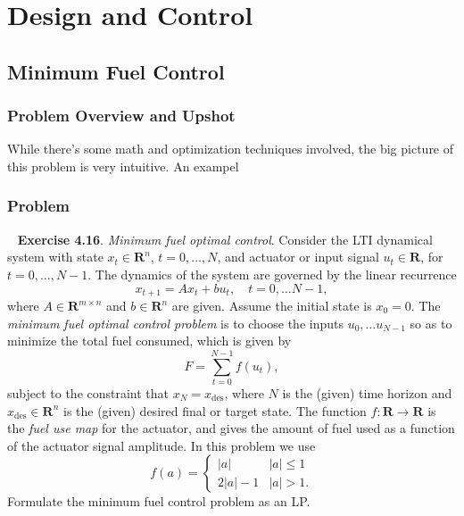 \documentclass[12pt,reqno]{article}
\theoremstyle{definition}
\numberwithin{equation}{section}
\begin{document}
\newpage

\section{Design and Control}

\subsection{Minimum Fuel Control}

\subsubsection*{Problem Overview and Upshot}
While there's some math and optimization techniques involved, the big picture of this problem is very intuitive.
An exampel 
\subsubsection*{Problem}

\noindent~\cite{boyd_convex_optimization} \textbf{Exercise 4.16}. \textit{Minimum fuel optimal control}.
    Consider the LTI dynamical system with state $x_t \in \mathbf{R}^n$, $t = 0, \ldots, N$, and actuator
    or input signal $u_t \in \mathbf{R}$, for $t = 0, \ldots, N-1$. The dynamics of the system are governed by the
    linear recurrence
    \[x_{t+1} = Ax_t + bu_t, \quad t=0, \ldots N-1,\]
    where $A \in \mathbf{R}^{m \times n}$ and $b \in \mathbf{R}^n$ are given. Assume the initial state is $x_0 = 0$.
    The \textit{minimum fuel optimal control problem} is to choose the inputs $u_0, \ldots u_{N-1}$ so as to
    minimize the total fuel consumed, which is given by
    \[F = \sum_{t=0}^{N-1}f(u_t),\]
    subject to the constraint that $x_N = x_{\text{des}}$, where $N$ is the (given) time horizon and
    $x_{\text{des}} \in \mathbf{R}^n$ is the (given) desired final or target state. The function $f: \mathbf{R} \to \mathbf{R}$
    is the \textit{fuel use map} for the actuator, and gives the amount of fuel used as a function of the actuator signal amplitude.
    In this problem we use
    \[f(a) = \begin{cases}
        \left| a \right| & \left| a \right| \le 1 \\
        2 \left| a \right| - 1 & \left| a \right| > 1.
        \end{cases}\]
    Formulate the minimum fuel control problem as an LP. 
\end{document}
